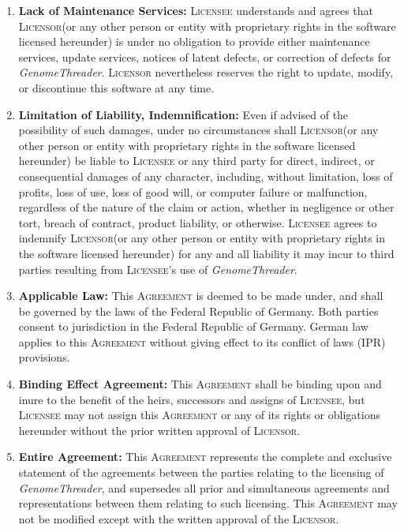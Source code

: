 \documentclass[12pt]{article}
\newcommand{\Software}[0]{\emph{GenomeThreader}\xspace}
\newcommand{\Licensor}[0]{\textsc{Licensor}\xspace}
\newcommand{\Licensee}[0]{\textsc{Licensee}\xspace}
\newcommand{\Agreement}[0]{\textsc{Agreement}\xspace}
\newcommand{\Paragraph}[2]{\item \textbf{#1:} #2}
\begin{document}
\begin{enumerate}
\Paragraph{Lack of Maintenance Services}{\Licensee understands and 
agrees that \Licensor (or any other person or entity with proprietary 
rights in the software licensed hereunder) is under no obligation to 
provide either maintenance services, update services, notices of 
latent defects, or correction of defects for \Software. 
\Licensor nevertheless reserves the right to update, modify, or 
discontinue this software at any time.
}

\Paragraph{Limitation of Liability, Indemnification}{Even if advised 
of the possibility of such damages, under no circumstances shall 
\Licensor (or any other person or entity with proprietary rights in 
the software licensed hereunder) be liable to \Licensee or any third 
party for direct, indirect, or consequential damages of any 
character, including, without limitation, loss of profits, loss of 
use, loss of good will, or computer failure or malfunction, 
regardless of the nature of the claim or action, whether in 
negligence or other tort, breach of contract, product liability, or 
otherwise. \Licensee agrees to indemnify \Licensor (or any other person 
or entity with proprietary rights in the software licensed hereunder) 
for any and all liability it may incur to third parties resulting 
from \Licensee's use of 
\Software.

}

\Paragraph{Applicable Law}{This \Agreement is deemed to be made under, 
and shall be governed by the laws of the Federal Republic of Germany. 
Both parties consent to jurisdiction in the Federal Republic of Germany.
German law applies to this \Agreement without giving effect to its 
conflict of laws (IPR) provisions. 
}

\Paragraph{Binding Effect Agreement}{This \Agreement shall be binding 
upon and inure to the benefit of the heirs, successors and assigns of 
\Licensee, but \Licensee may not assign this \Agreement or any of its 
rights or obligations hereunder without the prior written approval of 
\Licensor.
}

\Paragraph{Entire Agreement}{This \Agreement represents the complete 
and exclusive statement of the agreements between the parties 
relating to the licensing of \Software, and supersedes all 
prior and simultaneous agreements and representations between them 
relating to such licensing. This \Agreement may not be modified except 
with the written approval of the \Licensor.
}

\newpage


\end{enumerate}
\end{document}
